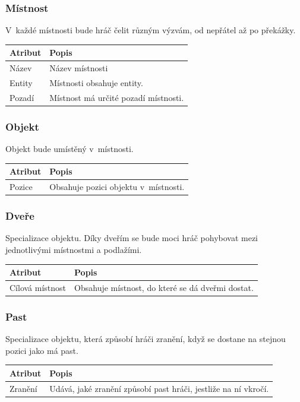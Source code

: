 \documentclass[12pt,a4paper]{article}
\begin{document}
\subsubsection{Místnost}
V~každé místnosti bude hráč čelit různým výzvám, od nepřátel až po
překážky.

\noindent
\begin{tabularx}{\textwidth}{|l|>{\raggedright}X|}
\hline
\cellcolor{black!80}\textcolor{gray!25}{\textbf{Atribut}} & \cellcolor{black!80}\textcolor{gray!20}{\textbf{Popis}}\tabularnewline \hline
 Název & Název místnosti \tabularnewline
\hline
 Entity & Místnosti obsahuje entity. \tabularnewline
\hline
 Pozadí & Místnost má určité pozadí místnosti.
\tabularnewline\hline
\end{tabularx}

\subsubsection{Objekt}
Objekt bude umístěný v~místnosti.

\noindent
\begin{tabularx}{\textwidth}{|l|>{\raggedright}X|}
\hline
\cellcolor{black!80}\textcolor{gray!25}{\textbf{Atribut}} & \cellcolor{black!80}\textcolor{gray!20}{\textbf{Popis}}\tabularnewline \hline
 Pozice & Obsahuje pozici objektu v~místnosti.
\tabularnewline\hline
\end{tabularx}

\subsubsection{Dveře}
Specializace objektu. Díky dveřím se bude moci hráč pohybovat mezi jednotlivými
místnostmi a podlažími.

\noindent
\begin{tabularx}{\textwidth}{|l|>{\raggedright}X|}
\hline
\cellcolor{black!80}\textcolor{gray!25}{\textbf{Atribut}} & \cellcolor{black!80}\textcolor{gray!20}{\textbf{Popis}}\tabularnewline \hline
 Cílová místnost & Obsahuje místnost, do které se dá dveřmi dostat.
\tabularnewline\hline
\end{tabularx}

\subsubsection{Past}
Specializace objektu, která způsobí hráči zranění, když se dostane na stejnou
pozici jako má past.

\noindent
\begin{tabularx}{\textwidth}{|l|>{\raggedright}X|}
\hline
\cellcolor{black!80}\textcolor{gray!25}{\textbf{Atribut}} & \cellcolor{black!80}\textcolor{gray!20}{\textbf{Popis}}\tabularnewline \hline
 Zranění & Udává, jaké zranění způsobí past hráči, jestliže na ní
  vkročí.
\tabularnewline\hline
\end{tabularx}
\end{document}
